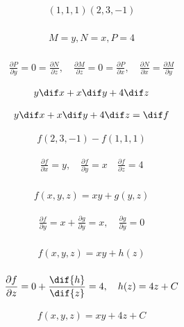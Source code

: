 \begin{align*}
(1,1,1) (2,3,-1)\\
\end{align*}

\begin{align*}
M=y,N=x,P=4\\
\end{align*}

\begin{align*}
\frac{\partial{P}}{\partial{y}}=0=\frac{\partial{N}}{\partial{z}},\quad\frac{\partial{M}}{\partial{z}}=0=\frac{\partial{P}}{\partial{x}},\quad\frac{\partial{N}}{\partial{x}}=\frac{\partial{M}}{\partial{y}}
\end{align*}

\begin{align*}y\dif x+x\dif y+4\dif z
\end{align*}

\begin{align*}
y\dif x+x\dif y+4\dif z=\dif f
\end{align*}

\begin{align*}
f(2,3,-1)-f(1,1,1)
\end{align*}

\begin{align*}
\frac{\partial f}{\partial{x}}=y,\quad\frac{\partial{f}}{\partial{y}}=x\quad\frac{\partial{f}}{\partial{z}}=4\\
\end{align*}

\begin{align*}
f(x,y,z)=xy+g(y,z)
\end{align*}

\begin{align*}
\frac{\partial{f}}{\partial{y}}=x+\frac{\partial{g}}{\partial{y}}=x,\quad\frac{\partial{g}}{\partial{y}}=0\\
\end{align*}

\begin{align*}
f(x,y,z)=xy+h(z)\\
\end{align*}

\begin{align*}
\frac{\partial{f}}{\partial{z}}=0+\frac{\dif{h}}{\dif{z}}=4,\quad h(z)=4z+C\\
\end{align*}

\begin{align*}
f(x,y,z)=xy+4z+C
\end{align*}

